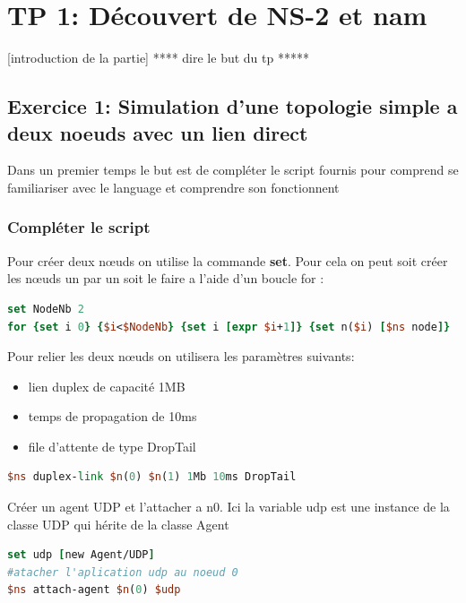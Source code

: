 \documentclass[11pt]{article}
\begin{document}
\section{TP 1: Découvert de NS-2 et nam}
[introduction de la partie] **** dire le but du tp  *****

\subsection{Exercice 1: Simulation d'une topologie simple a deux noeuds avec un lien direct}

Dans un premier temps le but est de compléter le script fournis pour comprend se familiariser avec le language et comprendre son fonctionnent

\subsubsection{Compléter le script}
\noindent 
Pour créer deux nœuds on utilise la commande \textbf{set}. Pour cela on peut soit créer les nœuds un par un soit le faire a l'aide d'un boucle for :

\begin{lstlisting}[language=tcl, numbers=none, framexleftmargin=0pt, framextopmargin=0pt, framexbottommargin=0pt]
set NodeNb 2
for {set i 0} {$i<$NodeNb} {set i [expr $i+1]} {set n($i) [$ns node]}
\end{lstlisting}

\noindent %
Pour relier les deux nœuds on utilisera les paramètres suivants:
\begin{itemize}
	\item lien duplex de capacité 1MB
	\item temps de propagation de 10ms
	\item file d'attente de type DropTail
\end{itemize}

\begin{lstlisting}[language=tcl, numbers=none, framexleftmargin=0pt, 	framextopmargin=0pt, framexbottommargin=0pt]
$ns duplex-link $n(0) $n(1) 1Mb 10ms DropTail
\end{lstlisting}

\noindent
Créer un agent UDP et l'attacher a n0. Ici la variable udp est une instance de la classe UDP qui hérite de la classe Agent

\begin{lstlisting}[language=tcl, numbers=none, framexleftmargin=0pt, 	framextopmargin=0pt, framexbottommargin=0pt]
set udp [new Agent/UDP]
#atacher l'aplication udp au noeud 0
$ns attach-agent $n(0) $udp 
\end{lstlisting}
\end{document}
